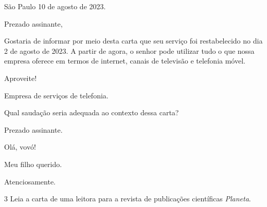 \begin{mdframed}[linewidth=10pt,linecolor=salmao!20,backgroundcolor=salmao!20,roundcorner=20pt]
\begin{flushright}
São Paulo 10 de agosto de 2023.
\end{flushright}

Prezado assinante,

Gostaria de informar por meio desta carta que seu serviço foi restabelecido no dia 2 de agosto de 2023. A partir de agora, o senhor pode utilizar tudo o que nossa empresa oferece em termos de internet, canais de televisão e telefonia móvel.

Aproveite!

Empresa de serviços de telefonia.

\end{mdframed}

\pagebreak
Qual saudação seria adequada ao contexto dessa carta?

\begin{escolha}
\item Prezado assinante.

\item Olá, vovó!

\item Meu filho querido.

\item Atenciosamente.
\end{escolha}

\num{3} Leia a carta de uma leitora para a revista de publicações
científicas \textit{Planeta}.


